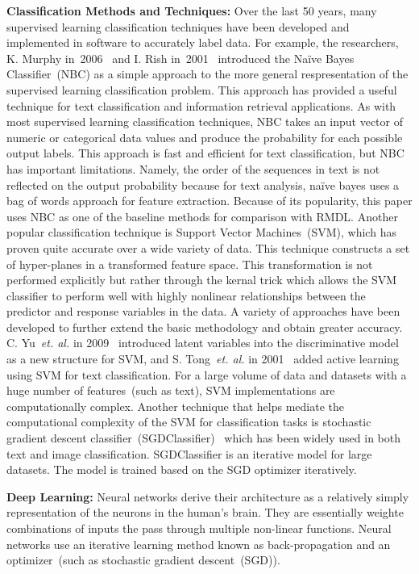 \documentclass[sigconf, final]{acmart}
\begin{document}
\textbf{Classification Methods and Techniques:}\label{subsec:related2} 
Over the last 50 years, many supervised learning classification techniques have been developed and implemented in software to accurately label  data. For example, the researchers, K. Murphy in~2006~\cite{murphy2006naive} and I. Rish in~2001~\cite{rish2001empirical} introduced the Na\"ive Bayes Classifier~(NBC) as a simple approach to the more general respresentation of the supervised learning classification problem. This approach has provided a useful technique for text classification and information retrieval applications. As with most supervised learning classification techniques, NBC takes an input vector of numeric or categorical data values and produce the probability for each possible output labels. This approach is fast and efficient for text classification, but NBC has important limitations. Namely, the order of the sequences in text is not reflected on the output probability because for text analysis, na\"ive bayes uses a bag of words approach for feature extraction. Because of its popularity, this paper uses NBC as one of the baseline methods for comparison with RMDL. Another  popular classification technique is Support Vector Machines~(SVM), which has proven quite accurate over a wide variety of data. This technique constructs a set of hyper-planes in a transformed feature space. This transformation is not performed explicitly but rather through the kernal trick which allows the SVM classifier to perform well with highly nonlinear relationships between the predictor and response variables in the data.  A variety of approaches have been developed to further extend the basic methodology and obtain greater accuracy. C. Yu~\textit{et. al.} in 2009~\cite{yu2009learning} introduced  latent variables into the discriminative model as a new structure for SVM, and S. Tong~\textit{et. al.} in 2001~\cite{tong2001support} added active learning using SVM for text classification. For a large volume of data and  datasets with a huge number of features~(such as text), SVM implementations are computationally complex. Another technique that helps mediate the computational complexity of the SVM for classification tasks is stochastic gradient descent classifier~(SGDClassifier)~\cite{kabir2015bangla} which has been widely used in both text and image classification. SGDClassifier is an iterative model for large datasets. The model is trained based on the SGD optimizer iteratively. 


\textbf{Deep Learning:}\label{subsec:related3}
Neural networks derive their architecture as a relatively simply representation of the neurons in the human's brain. They are essentially weighte combinations of inputs the pass through multiple non-linear functions. Neural networks use an iterative learning method known as back-propagation and an optimizer~(such as stochastic gradient descent~(SGD)). 
\end{document}
